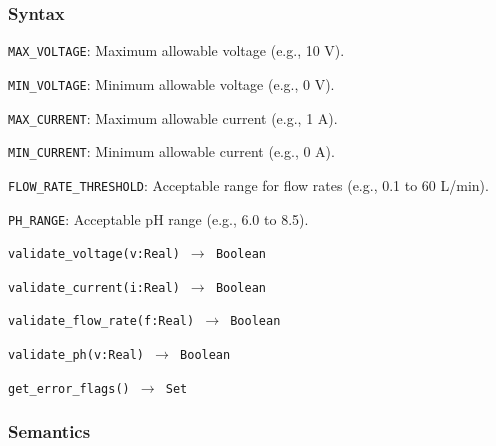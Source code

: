 \documentclass[12pt, titlepage]{article}
\begin{document}
\begin{description}
\begin{description}
\subsubsection{Syntax}
\begin{description}
  \item[Exported Constants:]
  \item 
  \lstinline{MAX_VOLTAGE}: Maximum allowable voltage (e.g., 10 V).
  \item
  \lstinline{MIN_VOLTAGE}: Minimum allowable voltage (e.g., 0 V).
  \item
  \lstinline{MAX_CURRENT}: Maximum allowable current (e.g., 1 A).
  \item
  \lstinline{MIN_CURRENT}: Minimum allowable current (e.g., 0 A).
  \item
  \lstinline{FLOW_RATE_THRESHOLD}: Acceptable range for flow rates (e.g., 0.1 to 60 L/min).
  \item
  \lstinline{PH_RANGE}: Acceptable pH range (e.g., 6.0 to 8.5).
  \item
  \item[Exported Access Programs:]
  \item
  \texttt{validate\_voltage(v:Real) \(\to\) Boolean}
  \item 
  \texttt{validate\_current(i:Real) \(\to\) Boolean}
  \item 
  \texttt{validate\_flow\_rate(f:Real) \(\to\) Boolean}
  \item
  \texttt{validate\_ph(v:Real) \(\to\) Boolean}
  \item
  \texttt{get\_error\_flags() \(\to\) Set}
\end{description}

\subsubsection{Semantics}
\begin{description}


\end{description}
\end{description}
\end{description}
\end{document}
